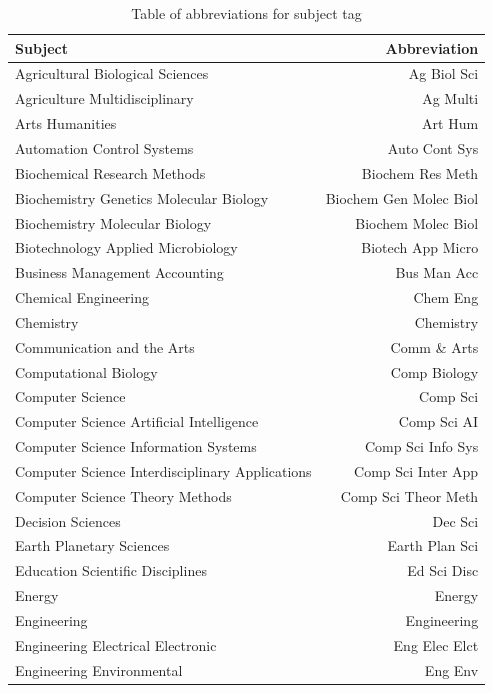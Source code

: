 \newpage

\begin{table}[h]
	\caption{Table of abbreviations for subject tag}
	\label{Tab:Abb2}
	\renewcommand{\arraystretch}{0.4}
	\centering
	\begin{tabular}{p{10cm} | r }
		\toprule
		Subject & Abbreviation \\ 
		\toprule
		Agricultural Biological Sciences &  Ag Biol Sci \\ 
		Agriculture Multidisciplinary &  Ag Multi \\
		Arts Humanities &   Art Hum \\ 
		Automation Control Systems &  Auto Cont Sys \\
		Biochemical Research Methods &  Biochem Res Meth \\
		Biochemistry Genetics Molecular Biology &  Biochem Gen Molec Biol \\ 
		Biochemistry Molecular Biology &  Biochem Molec Biol \\
		Biotechnology Applied Microbiology &  Biotech App Micro \\
		Business Management Accounting &   Bus Man Acc \\ 
		Chemical Engineering &   Chem Eng \\ 
		Chemistry &   Chemistry \\
		Communication and the Arts & Comm \& Arts \\
		Computational Biology & Comp Biology \\ 
		Computer Science &  Comp Sci \\ 
		Computer Science Artificial Intelligence &  Comp Sci AI \\
		Computer Science Information Systems &  Comp Sci Info Sys \\
		Computer Science Interdisciplinary Applications &  Comp Sci Inter App \\
		Computer Science Theory Methods &  Comp Sci Theor Meth \\
		Decision Sciences &  Dec Sci \\ 
		Earth Planetary Sciences &   Earth Plan Sci \\ 
		Education Scientific Disciplines &  Ed Sci Disc \\
		Energy &   Energy \\ 
		Engineering &  Engineering \\ 
		Engineering Electrical Electronic &  Eng Elec Elct \\
		Engineering Environmental &  Eng Env \\

\end{tabular}
\end{table}
